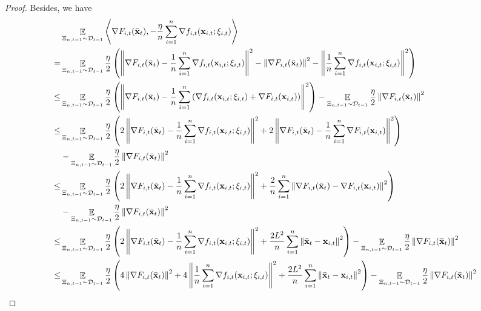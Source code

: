 \documentclass{article}
\begin{document}
\begin{proof}
Besides, we have
\begin{align}
\nonumber
& \EE_{ \Xi_{n,t-1} \sim \Dcal_{t-1} } \lrangle{\nabla F_{i,t}(\bar{\x}_t), -\frac{\eta}{n}\sum_{i=1}^n \nabla f_{i,t}(\x_{i,t};\xi_{i,t})} \\ \nonumber
= & \EE_{ \Xi_{n,t-1} \sim \Dcal_{t-1} } \frac{\eta}{2}\lrincir{ \lrnorm{\nabla F_{i,t}(\bar{\x}_t) -\frac{1}{n}\sum_{i=1}^n \nabla f_{i,t}(\x_{i,t};\xi_{i,t})}^2 - \lrnorm{\nabla F_{i,t}(\bar{\x}_t)}^2 - \lrnorm{\frac{1}{n}\sum_{i=1}^n \nabla f_{i,t}(\x_{i,t};\xi_{i,t})}^2 } \\ \nonumber
\le & \EE_{ \Xi_{n,t-1} \sim \Dcal_{t-1} } \frac{\eta}{2}\lrincir{ \lrnorm{\nabla F_{i,t}(\bar{\x}_t) -\frac{1}{n}\sum_{i=1}^n \lrincir{  \nabla  f_{i,t}(\x_{i,t};\xi_{i,t}) +   \nabla F_{i,t}(\x_{i,t}) } }^2 }  - \EE_{ \Xi_{n,t-1} \sim \Dcal_{t-1} } \frac{\eta}{2} \lrnorm{\nabla F_{i,t}(\bar{\x}_t)}^2  \\ \nonumber
\le & \EE_{ \Xi_{n,t-1} \sim \Dcal_{t-1} } \frac{\eta}{2}\lrincir{ 2 \lrnorm{\nabla F_{i,t}(\bar{\x}_t) -\frac{1}{n}\sum_{i=1}^n \nabla  f_{i,t}(\x_{i,t};\xi_{i,t})}^2 + 2 \lrnorm{ \nabla F_{i,t}(\bar{\x}_t) - \frac{1}{n}\sum_{i=1}^n\nabla F_{i,t}(\x_{i,t}) }^2 } \\ \nonumber 
& - \EE_{ \Xi_{n,t-1} \sim \Dcal_{t-1} } \frac{\eta}{2} \lrnorm{\nabla F_{i,t}(\bar{\x}_t)}^2  \\ \nonumber
\le & \EE_{ \Xi_{n,t-1} \sim \Dcal_{t-1} } \frac{\eta}{2}\lrincir{ 2 \lrnorm{\nabla F_{i,t}(\bar{\x}_t) -\frac{1}{n}\sum_{i=1}^n \nabla  f_{i,t}(\x_{i,t};\xi_{i,t})}^2 + \frac{2}{n}\sum_{i=1}^n \lrnorm{ \nabla F_{i,t}(\bar{\x}_t) - \nabla F_{i,t}(\x_{i,t}) }^2 } \\ \nonumber 
& - \EE_{ \Xi_{n,t-1} \sim \Dcal_{t-1} } \frac{\eta}{2} \lrnorm{\nabla F_{i,t}(\bar{\x}_t)}^2  \\ \nonumber
\le & \EE_{ \Xi_{n,t-1} \sim \Dcal_{t-1} } \frac{\eta}{2}\lrincir{ 2 \lrnorm{\nabla F_{i,t}(\bar{\x}_t) -\frac{1}{n}\sum_{i=1}^n \nabla  f_{i,t}(\x_{i,t};\xi_{i,t})}^2 + \frac{2L^2}{n}\sum_{i=1}^n \lrnorm{ \bar{\x}_t - \x_{i,t} }^2 }  - \EE_{ \Xi_{n,t-1} \sim \Dcal_{t-1} } \frac{\eta}{2} \lrnorm{\nabla F_{i,t}(\bar{\x}_t)}^2  \\ \nonumber
\le & \EE_{ \Xi_{n,t-1} \sim \Dcal_{t-1} } \frac{\eta}{2}\lrincir{ 4 \lrnorm{\nabla F_{i,t}(\bar{\x}_t)}^2  + 4 \lrnorm{\frac{1}{n}\sum_{i=1}^n \nabla  f_{i,t}(\x_{i,t};\xi_{i,t})}^2 + \frac{2L^2}{n}\sum_{i=1}^n \lrnorm{ \bar{\x}_t - \x_{i,t} }^2 }  - \EE_{ \Xi_{n,t-1} \sim \Dcal_{t-1} } \frac{\eta}{2} \lrnorm{\nabla F_{i,t}(\bar{\x}_t)}^2 \\ \label{equa_lemma_gradient_norm_temp1}

\end{align}
\end{proof}
\end{document}
